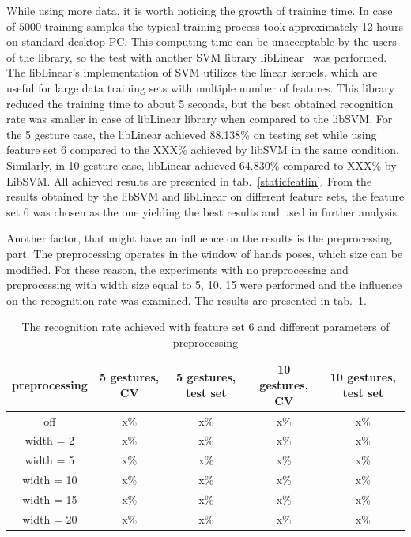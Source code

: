 While using more data, it is worth noticing the growth of training time. 
In case of $5000$ training samples the typical training process took approximately 12 hours on standard desktop PC. 
This computing time can be unacceptable by the users of the library, so the test with another SVM library libLinear~\cite{libLinear} was performed. 
The libLinear's implementation of SVM utilizes the linear kernels, which are useful for large data training sets with multiple number of features. 
This library reduced the training time to about 5 seconds, but the best obtained recognition rate was smaller in case of libLinear library when compared to the libSVM.
For the 5 gesture case, the libLinear achieved 88.138\% on testing set while using feature set 6 compared to the XXX\% achieved by libSVM in the same condition.
Similarly, in 10 gesture case, libLinear achieved 64.830\% compared to XXX\% by LibSVM.
All achieved results are presented in tab.~\ref{staticfeatlin}.
From the results obtained by the libSVM and libLinear on different feature sets, the feature set 6 was chosen as the one yielding the best results and used in further analysis.

Another factor, that might have an influence on the results is the preprocessing part. 
The preprocessing operates in the window of hands poses, which size can be modified. 
For these reason, the experiments with no preprocessing and preprocessing with width size equal to 5, 10, 15 were performed and the influence on the recognition rate was examined.
The results are presented in tab.~\ref{staticpre}.


\begin{table}[htp!]
\begin{center}
	\label{staticpre}
	\caption{The recognition rate achieved with feature set 6 and different parameters of preprocessing}
    \begin{tabular}{|c|c|c|c|c|}
    \hline
    preprocessing                                                   & 5 gestures, CV & 5 gestures, test set & 10 gestures, CV  & 10 gestures, test set \\ \hline
    off                     & x\% & x\%  & x\% & x\% \\ \hline
    width = 2                     & x\% & x\%  & x\% & x\% \\ \hline
    width = 5                     & x\% & x\%  & x\% & x\% \\ \hline
    width = 10                     & x\% & x\%  & x\% & x\% \\ \hline
    width = 15                     & x\% & x\%  & x\% & x\% \\ \hline
    width = 20                     & x\% & x\% & x\% & x\% \\ \hline
    \end{tabular}
    \end{center}
\end{table}

